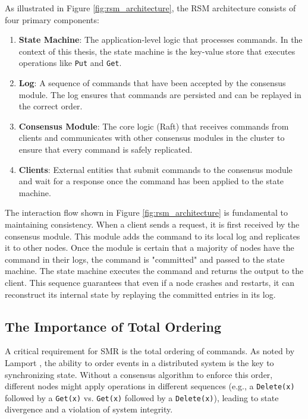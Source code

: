 As illustrated in Figure \ref{fig:rsm_architecture}, the RSM architecture consists of four primary components:
\begin{enumerate}
    \item \textbf{State Machine}: The application-level logic that processes commands. In the context of this thesis, the state machine is the key-value store that executes operations like \texttt{Put} and \texttt{Get}.
    \item \textbf{Log}: A sequence of commands that have been accepted by the consensus module. The log ensures that commands are persisted and can be replayed in the correct order.
    \item \textbf{Consensus Module}: The core logic (Raft) that receives commands from clients and communicates with other consensus modules in the cluster to ensure that every command is safely replicated.
    \item \textbf{Clients}: External entities that submit commands to the consensus module and wait for a response once the command has been applied to the state machine.
\end{enumerate}

The interaction flow shown in Figure \ref{fig:rsm_architecture} is fundamental to maintaining consistency. When a client sends a request, it is first received by the consensus module. This module adds the command to its local log and replicates it to other nodes. Once the module is certain that a majority of nodes have the command in their logs, the command is "committed" and passed to the state machine. The state machine executes the command and returns the output to the client. This sequence guarantees that even if a node crashes and restarts, it can reconstruct its internal state by replaying the committed entries in its log.

\subsection{The Importance of Total Ordering}
A critical requirement for SMR is the total ordering of commands. As noted by Lamport \cite{Lamport1978}, the ability to order events in a distributed system is the key to synchronizing state. Without a consensus algorithm to enforce this order, different nodes might apply operations in different sequences (e.g., a \texttt{Delete(x)} followed by a \texttt{Get(x)} vs. \texttt{Get(x)} followed by a \texttt{Delete(x)}), leading to state divergence and a violation of system integrity.


